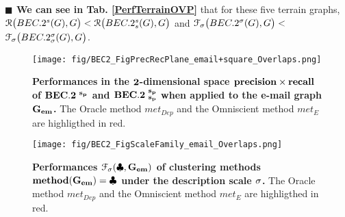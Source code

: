 \documentclass[12pt]{article}
\theoremstyle{thmstyleone}%
\theoremstyle{definition}
\begin{document}
\noindent
{\bf $\blacksquare$ We can see in Tab. \ref{PerfTerrainOVP}} that for these five terrain graphs,
$\EuScript{R}\big(BEC.2^{s}(G),G\big) < \EuScript{R}\big(BEC.2^{s}_{s}(G),G\big)$
and $\EuScript{F}_{\sigma}\big(BEC.2^{\sigma}(G),G\big) < $ $\EuScript{F}_{\sigma}\big(BEC.2^{\sigma}_{\sigma}(G),G\big)$.

\newpage
\begin{figure}[h!] \centering
     \texttt{[image: fig/BEC2\_FigPrecRecPlane\_email+square\_Overlaps.png]}
 \caption{{\bf Performances in the $\bf 2$-dimensional space $\bf precision\times recall$ of  $\bf BEC.2~^{s_p}$ and $\bf BEC.2~^{s_p}_{s_p}$ when applied to the e-mail graph $\bf G_{em}$.} The Oracle method $met_{Dep}$ and the Omniscient method $met_E$ are highligthed in red.
    \label{FigPrecRecPlane_email_Overlaps}}
 \end{figure}

\newpage
\begin{figure}[h!] \centering
     \texttt{[image: fig/BEC2\_FigScaleFamily\_email\_Overlaps.png]}
\caption{{\bf Performances $\bf \EuScript{F}_{\sigma}(\clubsuit,G_{em})$ of clustering methods
$\bf method(G_{em})=\clubsuit$ under the description scale $\bf \sigma$.}
The Oracle method $met_{Dep}$ and the Omniscient method $met_E$ are highligthed in red.
    \label{FigScaleFamily_email_Overlaps}}
\end{figure}
\end{document}
